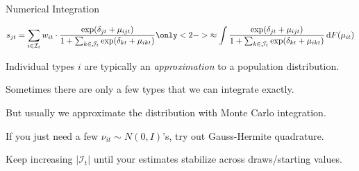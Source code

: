 \documentclass[aspectratio=169,t,11pt,table]{beamer}
\begin{document}
\begin{frame}{Numerical Integration}
    \vspace{-\baselineskip}
    \begin{minipage}[c][4\baselineskip][c]{\textwidth}
        \begin{equation*}
            s_{jt} = \sum_{i \in \mathcal{I}_t} w_{it} \cdot \frac{\exp(\delta_{jt} + \mu_{ijt})}{1 + \sum_{k \in \mathcal{J}_t} \exp(\delta_{kt} + \mu_{ikt})} \only<2->{\approx \int \frac{\exp(\delta_{jt} + \mu_{ijt})}{1 + \sum_{k \in \mathcal{J}_t} \exp(\delta_{kt} + \mu_{ikt})} \,\mathrm{d}F(\mu_{it})}
        \end{equation*}
    \end{minipage}
    \vspace{-0.5\baselineskip}
    \pause
    \begin{wideitemize}
        \item Individual types $i$ are typically an \textit{approximation} to a population distribution.
        \pause
        \item Sometimes there are only a few types that we can integrate exactly.
        \pause
        \item But usually we approximate the distribution with \alert{Monte Carlo} integration.
        \pause
        \item If you just need a few $\nu_{it} \sim N(0, I)$'s, try out \alert{Gauss-Hermite quadrature}.
        \pause
        \item \alert{Keep increasing $|\mathcal{I}_t|$} until your estimates stabilize across draws/starting values.
    \end{wideitemize}
\end{frame}
\end{document}

